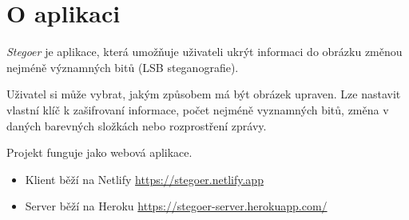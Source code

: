 
\section{O aplikaci}\label{sec:o-aplikaci}

\emph{Stegoer} je aplikace, která umožňuje uživateli ukrýt informaci do obrázku
změnou nejméně významných bitů (LSB steganografie).

Uživatel si může vybrat, jakým způsobem má být obrázek upraven.
Lze nastavit vlastní klíč k zašifrovaní informace,
počet nejméně vyznamných bitů, změna v daných barevných složkách nebo
rozprostření zprávy.

Projekt funguje jako webová aplikace.

\begin{itemize}
    \item Klient běží na Netlify \url{https://stegoer.netlify.app}
    \item Server běží na Heroku \url{https://stegoer-server.herokuapp.com/}
\end{itemize}
